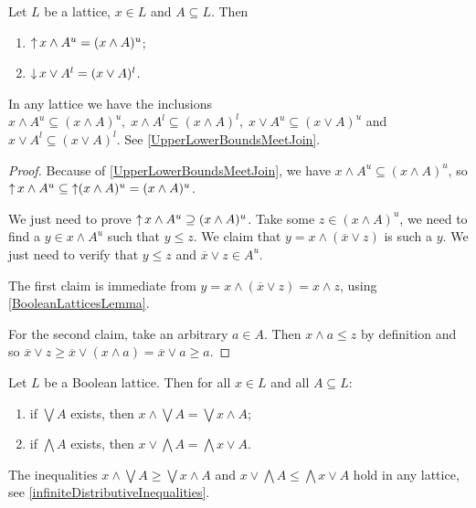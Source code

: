 \begin{lemma}
Let $L$ be a lattice, $x\in L$ and $A\subseteq L$. Then
\begin{enumerate}
\item $\mathop{\uparrow} x\wedge A^u = (x\wedge A)^u$;
\item $\mathop{\downarrow} x\vee A^l = (x\vee A)^l$.
\end{enumerate}
\end{lemma}
In any lattice we have the inclusions $x\wedge A^u \subseteq (x\wedge A)^u, \;x\wedge A^l \subseteq (x\wedge A)^l, \;x\vee A^u \subseteq (x\vee A)^u$ and $x\vee A^l \subseteq (x\vee A)^l$. See \ref{UpperLowerBoundsMeetJoin}.
\begin{proof}
Because of \ref{UpperLowerBoundsMeetJoin}, we have $x\wedge A^u \subseteq (x\wedge A)^u$, so $\mathop{\uparrow} x\wedge A^u \subseteq \mathop{\uparrow}(x\wedge A)^u = (x\wedge A)^u$.

We just need to prove $\mathop{\uparrow} x\wedge A^u \supseteq (x\wedge A)^u$. Take some $z\in (x\wedge A)^u$, we need to find a $y\in x\wedge A^u$ such that $y \leq z$. We claim that $y = x\wedge (\overline{x}\vee z)$ is such a $y$. We just need to verify that $y \leq z$ and $\overline{x}\vee z \in A^u$.

The first claim is immediate from $y = x\wedge (\overline{x}\vee z) = x\wedge z$, using \ref{BooleanLatticesLemma}.

For the second claim, take an arbitrary $a\in A$. Then $x\wedge a \leq z$ by definition and so $\overline{x}\vee z \geq \overline{x}\vee (x\wedge a) = \overline{x}\vee a \geq a$.
\end{proof}
\begin{corollary}
Let $L$ be a Boolean lattice. Then for all $x\in L$ and all $A\subseteq L$:
\begin{enumerate}
\item if $\bigvee A$ exists, then $x\wedge \bigvee A = \bigvee x\wedge A$;
\item if $\bigwedge A$ exists, then $x\vee \bigwedge A = \bigwedge x\vee A$.
\end{enumerate}
\end{corollary}
The inequalities $x\wedge \bigvee A \geq \bigvee x\wedge A$ and $x\vee \bigwedge A \leq \bigwedge x\vee A$ hold in any lattice, see \ref{infiniteDistributiveInequalities}.

